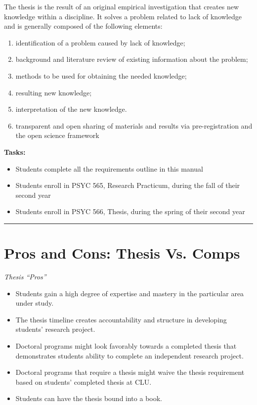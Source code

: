\documentclass[openany]{book}
\providecommand{\tightlist}{%
  \setlength{\itemsep}{0pt}\setlength{\parskip}{0pt}}
\begin{document}
The thesis is the result of an original empirical investigation that creates new knowledge within a discipline. It solves a problem related to lack of knowledge and is generally composed of the following elements:

\begin{enumerate}
\def\labelenumi{\arabic{enumi}.}
\tightlist
\item
  identification of a problem caused by lack of knowledge;
\item
  background and literature review of existing information about the problem;
\item
  methods to be used for obtaining the needed knowledge;
\item
  resulting new knowledge;
\item
  interpretation of the new knowledge.
\item
  transparent and open sharing of materials and results via pre-registration and the open science framework
\end{enumerate}

\textbf{Tasks:}

\begin{itemize}
\tightlist
\item
  Students complete all the requirements outline in this manual
\item
  Students enroll in PSYC 565, Research Practicum, during the fall of their second year
\item
  Students enroll in PSYC 566, Thesis, during the spring of their second year
\end{itemize}

\begin{center}\rule{0.5\linewidth}{0.5pt}\end{center}

\hypertarget{pros-and-cons-thesis-vs.-comps}{%
\section{Pros and Cons: Thesis Vs. Comps}\label{pros-and-cons-thesis-vs.-comps}}

\emph{Thesis ``Pros''}

\begin{itemize}
\tightlist
\item
  Students gain a high degree of expertise and mastery in the particular area under study.
\item
  The thesis timeline creates accountability and structure in developing students' research project.
\item
  Doctoral programs might look favorably towards a completed thesis that demonstrates students ability to complete an independent research project.
\item
  Doctoral programs that require a thesis might waive the thesis requirement based on students' completed thesis at CLU.
\item
  Students can have the thesis bound into a book.
\end{itemize}
\end{document}
